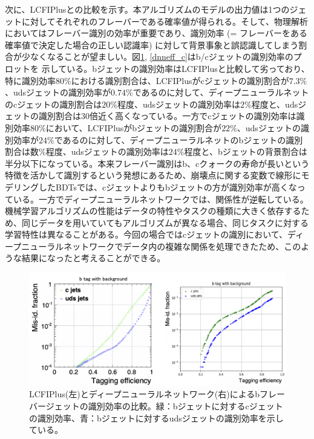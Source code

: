 次に、LCFIPlusとの比較を示す。本アルゴリズムのモデルの出力値は1つのジェットに対してそれぞれのフレーバーである確率値が得られる。そして、物理解析においてはフレーバー識別の効率が重要であり、識別効率 (= フレーバーをある確率値で決定した場合の正しい認識率) に対して背景事象と誤認識してしまう割合が少なくなることが望ましい。図\ref{dnneff_b}, \ref{dnneff_c}はb/cジェットの識別効率のプロットを
示している。bジェットの識別効率はLCFIPlusと比較して劣っており、特に識別効率$80\%$における識別割合は、LCFIPlusがcジェットの識別割合が$7.3\%$、udsジェットの識別効率が$0.74\%$であるのに対して、ディープニューラルネットのcジェットの識別割合は$20\%程度$、udsジェットの識別効率は$2\%程度$と、udsジェットの識別割合は30倍近く高くなっている。一方でcジェットの識別効率は識別効率$80\%$において、LCFIPlusがbジェットの識別割合が$22\%$、udsジェットの識別効率が$24\%$であるのに対して、ディープニューラルネットのbジェットの識別割合は$数\%程度$、udsジェットの識別効率は$24\%程度$と、bジェットの背景割合は半分以下になっている。本来フレーバー識別はb、cクォークの寿命が長いという特徴を活かして識別するという発想にあるため、崩壊点に関する変数で線形にモデリングしたBDTsでは、cジェットよりもbジェットの方が識別効率が高くなっている。一方でディープニューラルネットワークでは、関係性が逆転している。機械学習アルゴリズムの性能はデータの特性やタスクの種類に大きく依存するため、同じデータを用いていてもアルゴリズムが異なる場合、同じタスクに対する学習特性は異なることがある。今回の場合ではcジェットの識別において、ディープニューラルネットワークでデータ内の複雑な関係を処理できたため、このような結果になったと考えることができる。
\begin{figure}[H]
	\begin{center}
 \includegraphics[keepaspectratio, scale=0.3]
 	{Figure/Flavortagging/dnneff_b.png}
 		\caption{LCFIPlus(左)とディープニューラルネットワーク(右)によるbフレーバージェットの識別効率の比較。緑：bジェットに対するcジェットの識別効率、青：bジェットに対するudsジェットの識別効率を示している。}
 		\label{dnneff_b}
	\end{center}
\end{figure}


